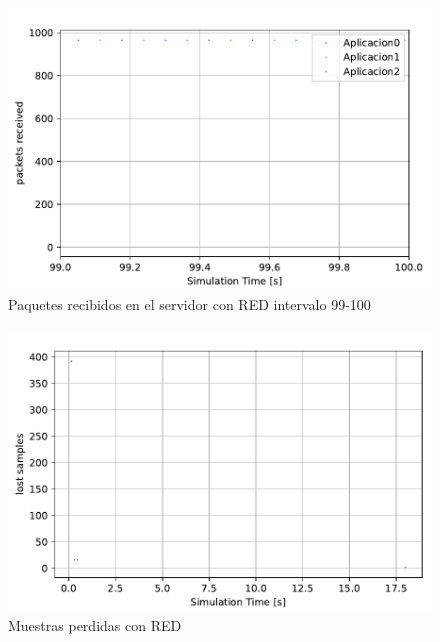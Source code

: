 \begin{figure}
    \centering
    \includegraphics{graficas/RED/packetsReceived_RED_99.pdf}
    \caption{Paquetes recibidos en el servidor con RED intervalo 99-100}
    \label{fig:sinqos_pktreceived99100}
\end{figure}

\begin{figure}
    \centering
    \includegraphics{graficas/RED/muestras_perdidas_red.pdf}
    \caption{Muestras perdidas con RED}
    \label{fig:sinqos_pktreceived99100}
\end{figure}


